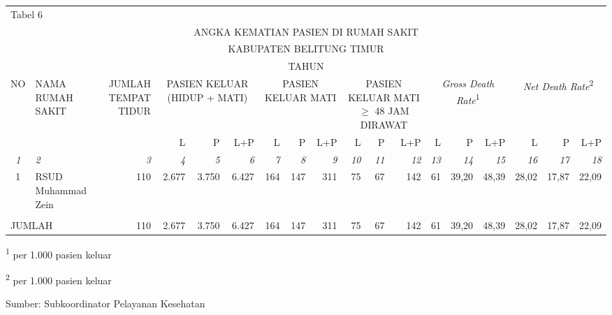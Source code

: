 {}

\begin{tabular}{clrrrrrrrrrrrrrrrr}
	\multicolumn{18}{l}{Tabel 6}\\
	\multicolumn{18}{c}{ANGKA KEMATIAN PASIEN DI RUMAH SAKIT}\\
	\multicolumn{18}{c}{KABUPATEN BELITUNG TIMUR}\\
	\multicolumn{18}{c}{TAHUN \tP}\\
	\toprule
	\multirow{2}{*}{NO} & \multirow{2}{*}{NAMA RUMAH SAKIT} & \multirow{2}{1.5cm}{\raggedleft JUMLAH TEMPAT TIDUR} & \multicolumn{3}{c}{\parbox{3cm}{\centering PASIEN KELUAR (HIDUP + MATI)}} & \multicolumn{3}{c}{\parbox{3cm}{\centering PASIEN KELUAR MATI}} &\multicolumn{3}{c}{\parbox{2.9cm}{\centering PASIEN KELUAR MATI $\geq$ 48 JAM DIRAWAT}} & \multicolumn{3}{c}{\parbox{2.9cm}{\centering \emph{Gross Death Rate}\textsuperscript{1}}} & \multicolumn{3}{c}{\parbox{2.9cm}{\centering \emph{Net Death Rate}\textsuperscript{2}}} \\
	\cmidrule(l{2pt}r{2pt}){4-6}\cmidrule(l{2pt}r{2pt}){7-9}\cmidrule(l{2pt}r{2pt}){10-12}\cmidrule(l{2pt}r{2pt}){13-15}\cmidrule(l{2pt}r{2pt}){16-18}
	& & & L & P & L+P & L & P & L+P & L & P & L+P & L & P & L+P & L & P & L+P \\
	\midrule
	\emph{1} & \emph{2} & \emph{3} & \emph{4} & \emph{5} & \emph{6} & \emph{7} & \emph{8} & \emph{9} & \emph{10} & \emph{11} & \emph{12} & \emph{13} & \emph{14} & \emph{15} & \emph{16} & \emph{17} & \emph{18} \\
	\midrule
	1 & RSUD Muhammad Zein     & 110 & 2.677 & 3.750 & 6.427 & 164 & 147 & 311 & 75 & 67 & 142 & 61 & 39,20 & 48,39 & 28,02 & 17,87 & 22,09 \\
	&&&&&&&&&&&&&&&&&\\
	\midrule
	\multicolumn{2}{l}{JUMLAH} & 110 & 2.677 & 3.750 & 6.427 & 164 & 147 & 311 & 75 & 67 & 142 & 61 & 39,20 & 48,39 & 28,02 & 17,87 & 22,09 \\
	\bottomrule
\end{tabular}%
\vspace{2ex}

{
\textsuperscript{1} per 1.000 pasien keluar\par
\textsuperscript{2} per 1.000 pasien keluar}

\vfill
Sumber: Subkoordinator Pelayanan Kesehatan\par
